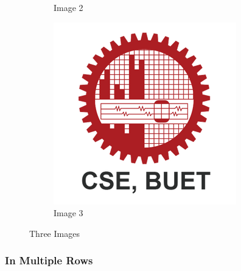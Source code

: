 \documentclass[twocolumn]{article}
\begin{document}
\begin{figure}[htbp]
\begin{subfigure}{0.3\columnwidth}
         \caption{Image 2}
     \end{subfigure}
     \hfill
     \begin{subfigure}{0.3\columnwidth}
         \centering
         \includegraphics[width=\columnwidth]{Images/CSE_BUET.png}
         \caption{Image 3}
     \end{subfigure}
        \caption{Three Images}
\end{figure}

\pagebreak

\subsubsection{In Multiple Rows}
\end{document}
